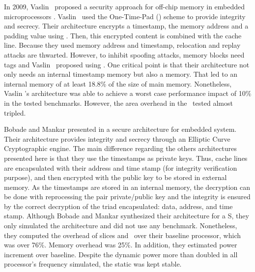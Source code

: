 In 2009, Vaslin \etal~proposed a security approach for off-chip memory in embedded microprocessors \cite{Vaslin2009:OTP}. Vaslin \etal~used the One-Time-Pad (\otp) scheme to provide integrity and secrecy. Their architecture encrypts a timestamp, the memory address and a padding value using \aes. Then, this encrypted content is combined with the cache line. Because they used memory address and timestamp, relocation and replay attacks are thwarted. However, to inhibit spoofing attacks, memory blocks need tags and Vaslin \etal~proposed using . One critical point is that their architecture not only needs an internal timestamp memory but also a  memory. That led to an internal memory of at least 18.8\% of the size of main memory. Nonetheless, Vaslin \etal's architecture was able to achieve a worst case performance impact of 10\% in the tested benchmarks. However, the area overhead in the \fpga~tested almost tripled.


Bobade and Mankar presented in \cite{Bobade2015:SecurityFPGA} a secure architecture for embedded system. Their architecture provides integrity and secrecy through an Elliptic Curve Cryptographic engine. The main difference regarding the others architectures presented here is that they use the timestamps as private keys. Thus, cache lines are encapsulated with their address and time stamp (for integrity verification purpose), and then encrypted with the public key to be stored in external memory. As the timestamps are stored in an internal memory, the decryption can be done with reprocessing the pair private\slash{}public key and the integrity is ensured by the correct decryption of the triad encapsulated: data, address, and time stamp. Although Bobade and Mankar synthesized their architecture for a {\fpga}S, they only simulated the architecture and did not use any benchmark. Nonetheless, they computed the overhead of slices and \luts~over their baseline processor, which was over 76\%. Memory overhead was 25\%. In addition, they estimated power increment over baseline. Despite the dynamic power more than doubled in all processor's frequency simulated, the static was kept stable.

